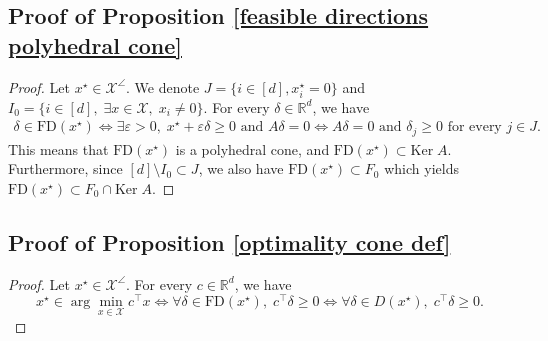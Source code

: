 \documentclass[11pt]{article}
\theoremstyle{plain}
\theoremstyle{definition}
\newcommand{\R}[0]{\mathbb R}
\newcommand{\Ker}[0]{\mathrm{Ker}\;}
\newcommand{\FD}{\mathrm{FD}}
\newcommand{\cX}{\mathcal{X}}
\begin{document}
\subsection{Proof of Proposition \ref{feasible directions polyhedral cone}} \label{feasible directions polyhedral cone proof}
\begin{proof}

    Let $x^\star \in \cX^\angle$. We denote $J=\{i\in [d], x^\star_i = 0\}$ and $I_0=\{i\in [d],\; \exists x\in \cX,\; x_i\neq 0\}$. For every $\delta \in \R^d$, we have 
    \begin{align*}
        \delta \in \FD(x^\star) \Longleftrightarrow \exists \varepsilon>0,\; x^\star +\varepsilon \delta \geq 0\text{ and }A\delta =0
        \Longleftrightarrow A\delta = 0 \text{ and }\delta_j \geq 0 \text{ for every }j\in J.
    \end{align*}
    This means that $\FD(x^\star)$ is a polyhedral cone, and $\FD(x^\star)\subset \Ker A$. Furthermore, since $[d]\setminus I_0 \subset J$, we also have $\FD(x^\star) \subset F_0$ which yields $\FD(x^\star)\subset F_0 \cap \Ker A$.
\end{proof}
\subsection{Proof of Proposition \ref{optimality cone def}} \label{proof optimality cone def}
\begin{proof}
Let $x^\star \in \cX^\angle$. For every $c\in \R^d$, we have
$$x^\star \in \arg\min_{x\in \cX}c^\top x \Longleftrightarrow \forall \delta \in \FD(x^\star),\; c^\top \delta \geq 0 \Longleftrightarrow \forall \delta \in D(x^\star),\; c^\top \delta \geq 0. $$
\end{proof}
\end{document}
